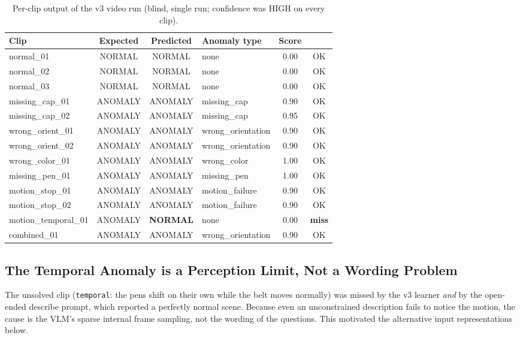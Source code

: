 \begin{table}[!htbp]
\centering
\footnotesize
\caption{\label{tab:perclip}Per-clip output of the v3 video run (blind, single run;
confidence was HIGH on every clip).}
\begin{tabular}{l|c|c|l|c|c}
\hline
Clip & Expected & Predicted & Anomaly type & Score & \\
\hline
normal\_01           & NORMAL  & NORMAL  & none              & 0.00 & OK \\
normal\_02           & NORMAL  & NORMAL  & none              & 0.00 & OK \\
normal\_03           & NORMAL  & NORMAL  & none              & 0.00 & OK \\
missing\_cap\_01     & ANOMALY & ANOMALY & missing\_cap      & 0.90 & OK \\
missing\_cap\_02     & ANOMALY & ANOMALY & missing\_cap      & 0.95 & OK \\
wrong\_orient\_01    & ANOMALY & ANOMALY & wrong\_orientation& 0.90 & OK \\
wrong\_orient\_02    & ANOMALY & ANOMALY & wrong\_orientation& 0.90 & OK \\
wrong\_color\_01     & ANOMALY & ANOMALY & wrong\_color      & 1.00 & OK \\
missing\_pen\_01     & ANOMALY & ANOMALY & missing\_pen      & 1.00 & OK \\
motion\_stop\_01     & ANOMALY & ANOMALY & motion\_failure   & 0.90 & OK \\
motion\_stop\_02     & ANOMALY & ANOMALY & motion\_failure   & 0.90 & OK \\
motion\_temporal\_01 & ANOMALY & \textbf{NORMAL} & none      & 0.00 & \textbf{miss} \\
combined\_01         & ANOMALY & ANOMALY & wrong\_orientation& 0.90 & OK \\
\hline
\end{tabular}
\end{table}

\subsection{The Temporal Anomaly is a Perception Limit, Not a Wording Problem}
The unsolved clip (\texttt{temporal}: the pens shift on their own while the belt moves
normally) was missed by the v3 learner \emph{and} by the open-ended describe prompt,
which reported a perfectly normal scene. Because even an unconstrained description fails
to notice the motion, the cause is the VLM's sparse internal frame sampling, not the
wording of the questions. This motivated the alternative input representations below.

